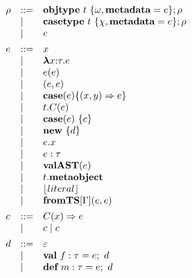 \begin{figure}[t]
\centering
\[
\begin{array}[t]{lll} 
\rho & \bnfdef & \keyw{objtype}~ t~ \{ \omega, \keyw{metadata}=e \}; \rho \\
     & \bnfalt & \keyw{casetype}~ t~ \{ \chi, \keyw{metadata}=e \}; \rho\\
     & \bnfalt & e
     \\[1ex]
e    & \bnfdef & x \\
     & \bnfalt & \boldsymbol\lambda x{:}\tau . e \\ %
     & \bnfalt & e(e) \\
     & \bnfalt & (e, e) \\
     & \bnfalt & \keyw{case}(e) \{(x, y) \Rightarrow e\}\\
     & \bnfalt & t.C(e) \\
     & \bnfalt & \keyw{case}(e)~\{ c \} \\
     & \bnfalt & \keyw{new}~ \{ d \}\\
     & \bnfalt & e.x \\
     & \bnfalt & e : \tau\\
     & \bnfalt & \keyw{valAST}(e) \\
     & \bnfalt & t.\keyw{metaobject}\\
     & \bnfalt & \lfloor literal \rfloor \\
     & \bnfalt & \keyw{fromTS}[\Gamma](e, e)
\\[1ex]	
c    & \bnfdef & C(x) \Rightarrow e\\
     & \bnfalt & c \bnfalt c
	 \\[1ex]
d   & \bnfdef & \varepsilon \\
     & \bnfalt & \keyw{val}~ f:\tau = e;~d \\
     & \bnfalt & \keyw{def}~ m:\tau = e;~d
\\[1ex] 
\end{array}
\begin{array}[t]{lll}
~~~
\end{array}
\begin{array}[t]{lll}



\end{array}\]
\end{figure}
